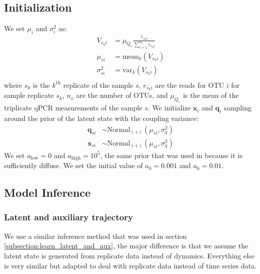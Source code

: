 \documentclass{article}
\newcommand{\var}{\sigma^2}
\newcommand{\Normaldist}{\text{Normal}}
\newcommand{\qq}{\mathbf{q}}
\newcommand{\xx}{\mathbf{x}}
\newcommand{\varcoupling}{\var_q}
\begin{document}
\begin{appendices}
  \subsection{Initialization}
  We set $\mu_i$ and $\sigma^2_i$ as:
  \begin{align}
    V_{s_ki} & = \mu_{Q_s} \frac{r_{s_k i}}{\sum_{i=1}^{n_o}r_{s_k i}} \\
    \mu_{si} & = \text{mean}_k (V_{s_k i}) \\
    \sigma^2_{si} & = \text{var}_k (V_{s_k i}) \\
  \end{align}
  where $s_k$ is the $k^{\text{th}}$ replicate of the sample $s$, $r_{s_k i}$ are the reads for OTU $i$ for sample replicate $s_k$, $n_o$ are the number of OTUs, and $\mu_{Q_s}$ is the mean of the triplicate qPCR measurements of the sample $s$. We initialize $\xx_i$ and $\qq_i$ sampling around the prior of the latent state with the coupling variance:
  \begin{align}
    \qq_{si} & \sim \Normaldist_{(+)} ( \mu_{si}, \varcoupling) \\
    \xx_{si} & \sim \Normaldist_{(+)} ( \mu_{si}, \varcoupling)
  \end{align}
  We set $a_{\text{low}} = 0$ and $a_{\text{high}} = 10^5$, the same prior that was used in \cite{cite:MDSINE} because it is sufficiently diffuse. We set the initial value of $a_0 = 0.001$ and $a_0 = 0.01$.

  \subsection{Model Inference}
  \subsubsection{Latent and auxiliary trajectory}
  We use a similar inference method that was used in section \ref{subsection:learn_latent_and_aux}, the major difference is that we assume the latent state is generated from replicate data instead of dynamics. Everything else is very similar but adapted to deal with replicate data instead of time series data.


\end{appendices}
\end{document}
